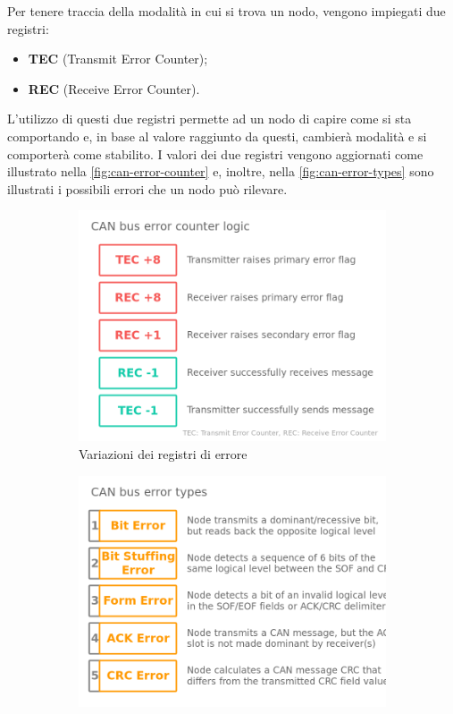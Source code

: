 Per tenere traccia della modalità in cui si trova un nodo, vengono impiegati due registri:
\begin{itemize}
    \item \textbf{TEC} (Transmit Error Counter);
    \item \textbf{REC} (Receive Error Counter).
\end{itemize}
L'utilizzo di questi due registri permette ad un nodo di capire come si sta comportando e, in base al valore raggiunto da questi, cambierà modalità e si comporterà come stabilito. I valori dei due registri vengono aggiornati come illustrato nella \autoref{fig:can-error-counter} e, inoltre, nella \autoref{fig:can-error-types} sono illustrati i possibili errori che un nodo può rilevare. \cite{css_electronics_can} \cite{wikipedia_canbus}
\begin{figure}[h]
    \begin{subfigure}{0.45\textwidth}
        \includegraphics[width=1\textwidth]{capitoli/figure-protocolli/CAN-bus-error-counter.png}
        \caption{Variazioni dei registri di errore}
        \label{fig:can-error-counter}    
    \end{subfigure}
    \hfill
    \begin{subfigure}{0.45\textwidth}
        \includegraphics[width=1\textwidth]{capitoli/figure-protocolli/CAN-bus-error-types.png}

\end{subfigure}
\end{figure}
